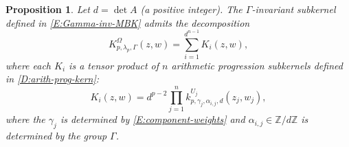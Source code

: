 \documentclass[letterpaper,11pt,reqno]{amsart}
\theoremstyle{plain}
\newtheorem{proposition}[equation]{Proposition}
\theoremstyle{definition}
\theoremstyle{remark}
\theoremstyle{remark}
\numberwithin{equation}{section}
\newcommand{\Z}{{\mathbb Z}}
\begin{document}
\begin{proposition}\label{P:Gamma-inv-MBK-decomp}
Let $d = \det A$ (a positive integer). 
The $\Gamma$-invariant subkernel defined in \eqref{E:Gamma-inv-MBK} admits the decomposition
\begin{equation}\label{E:Gamma-inv-MBK-decomp1}
K^\Omega_{p,\lambda_p,\Gamma}(z,w) = \sum_{i=1}^{d^{n-1}} K_i(z,w),
\end{equation}
where each $K_i$ is a tensor product of $n$ arithmetic progression subkernels defined in \eqref{D:arith-prog-kern}:
\begin{equation}\label{E:Gamma-inv-MBK-decomp2}
K_i(z,w) = d^{p-2} \prod_{j=1}^n k^{U_j}_{p,\gamma_j,\alpha_{i,j},d}(z_j,w_j),
\end{equation}
where the $\gamma_j$ is determined by \eqref{E:component-weights} and $\alpha_{i,j}\in \Z/d\Z$ is determined by the group $\Gamma$.
\end{proposition}
\end{document}
